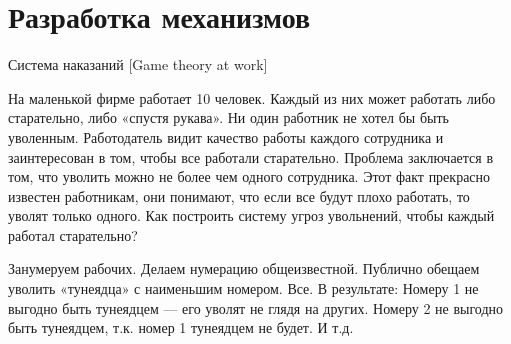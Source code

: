 \section{Разработка механизмов}

\begin{problem}
 Система наказаний [Game theory at work]\par
На маленькой фирме работает 10 человек. Каждый из них может работать либо старательно, либо «спустя рукава». Ни один работник не хотел бы быть уволенным. Работодатель видит качество работы каждого сотрудника и заинтересован в том, чтобы все работали старательно. Проблема заключается в том, что уволить можно не более чем одного сотрудника. Этот факт прекрасно известен работникам, они понимают, что если все будут плохо работать, то уволят только одного. Как построить систему угроз увольнений, чтобы каждый работал старательно?\par




\begin{sol}
Занумеруем рабочих. Делаем нумерацию общеизвестной. Публично обещаем уволить «тунеядца» с наименьшим номером. Все. В результате: Номеру 1 не выгодно быть тунеядцем — его уволят не глядя на других. Номеру 2 не выгодно быть тунеядцем, т.к. номер 1 тунеядцем не будет. И т.д.
\end{sol}
\end{problem}



